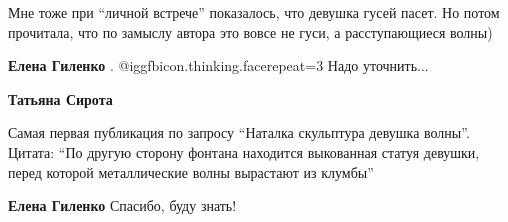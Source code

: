  
 
 
 
 


Мне тоже при \enquote{личной встрече} показалось, что девушка гусей пасет. Но потом
прочитала, что по замыслу автора это вовсе не гуси, а расступающиеся волны)

\textbf{Елена Гиленко} . @igg{fbicon.thinking.face}{repeat=3} 
Надо уточнить...

\textbf{Татьяна Сирота}

Самая первая публикация по запросу \enquote{Наталка скульптура девушка волны}. Цитата:
\enquote{По другую сторону фонтана находится выкованная статуя девушки, перед которой
металлические волны вырастают из клумбы}

\textbf{Елена Гиленко} Спасибо, буду знать!
